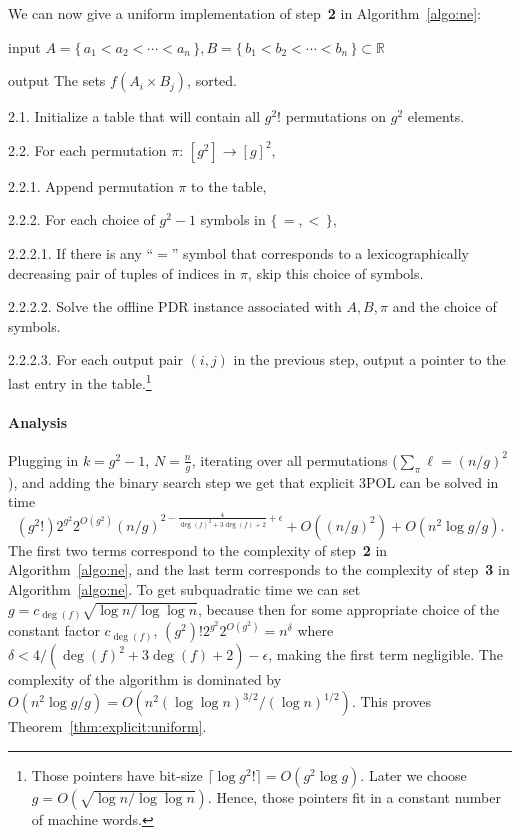 We can now give a uniform implementation of step~\textbf{2} in
Algorithm~\ref{algo:ne}:
\begin{algorithm}\label{algo:sfaixbj-uniform}
\item[input] $A = \{\,a_1<a_2<\cdots<a_n\,\},B = \{\,b_1<b_2<\cdots<b_n\,\}
    \subset \mathbb{R}$
\item[output] The sets $f(A_i \times B_j)$, sorted.
\item[2.1.] Initialize a table that will contain all $ g^2! $ permutations on $g^2$ elements.
\item[2.2.] For each permutation $\pi\colon\,[g^2]\to{[g]}^2$,
\item[2.2.1.] Append permutation $\pi$ to the table,
\item[2.2.2.] For each choice of $g^2-1$ symbols in $\{\,=,<\,\}$,
\item[2.2.2.1.] If there is any ``$=$'' symbol that corresponds to a
    lexicographically decreasing
    pair of tuples of indices in $\pi$, skip this choice of symbols.
\item[2.2.2.2.] Solve the offline PDR instance associated
    with $A,B,\pi$ and the choice of symbols.
\item[2.2.2.3.] For each output pair $(i,j)$ in the previous step,
    output a pointer to the last entry in the table.\footnote{%
	Those pointers have bit-size \(\lceil\log{{g^2}!}\rceil = O(g^2 \log g)\).
	Later we choose \(g = O(\sqrt{\log n / \log \log n})\).
	Hence,
	those pointers fit in a constant number of machine words.
    }
\end{algorithm}


\paragraph{Analysis} Plugging in $k=g^2-1$, $N=\frac ng$, iterating over all
permutations ($\sum_{\pi} \ell = {(n/g)}^2$), and adding the binary search step we
get that
explicit 3POL can be solved in time
\begin{displaymath}
    (g^2!)2^{g^2}2^{O(g^2)}
    {(n/g)}^{2-\frac{4}{{\deg(f)}^2+3\deg(f)+2}+\epsilon} + O({(n/g)}^2) +
    O(n^2 \log g / g).
\end{displaymath}
The first two terms correspond to the complexity of step~\textbf{2} in
Algorithm~\ref{algo:ne}, and the last term corresponds to the complexity of
step~\textbf{3} in Algorithm~\ref{algo:ne}.
To get subquadratic time we can set
$g = c_{\deg(f)}\sqrt{\log n/\log \log n}$,
because then
for some appropriate choice of the constant factor $c_{\deg(f)}$,
$(g^2)!2^{g^2}2^{O(g^2)} = n^{\delta}$ where $\delta<
4/({\deg(f)}^2+3\deg(f)+2) - \epsilon$, making the first term negligible.
The complexity of the algorithm is dominated by $O(n^2 \log g / g) = O(n^2
{(\log \log n)}^{3/2} / {(\log n)}^{1/2} )$.
This proves Theorem~\ref{thm:explicit:uniform}.


